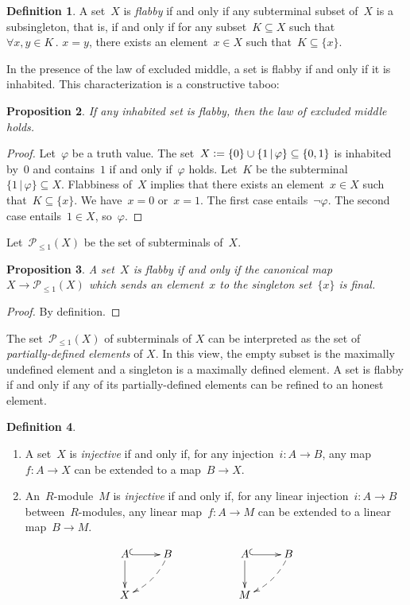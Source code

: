 \documentclass[oneside]{amsart}
\theoremstyle{definition}
\newtheorem{defn}{Definition}[section]
\theoremstyle{plain}
\newtheorem{prop}[defn]{Proposition}
\theoremstyle{remark}
\renewcommand{\P}{\mathcal{P}}
\newcommand{\defeq}{\vcentcolon=}
\renewcommand{\_}{\mathpunct{.}\,}
\begin{document}
\begin{defn}A set~$X$ is \emph{flabby} if and only if any subterminal subset
of~$X$ is a subsingleton, that is, if and only if for any subset~$K \subseteq
X$ such that~$\forall x,y \in K\_ x = y$, there exists an element~$x \in X$
such that~$K \subseteq \{ x \}$.
\end{defn}

In the presence of the law of excluded middle, a set is flabby if and only if
it is inhabited. This characterization is a constructive taboo:

\begin{prop}\label{prop:taboo}
If any inhabited set is flabby, then the law of excluded middle
holds.
\end{prop}

\begin{proof}Let~$\varphi$ be a truth value. The set~$X \defeq \{ 0 \}
\cup \{ 1 \,|\, \varphi \} \subseteq \{ 0,1 \}$ is inhabited by~$0$ and
contains~$1$ if and only if~$\varphi$ holds. Let~$K$ be the subterminal~$\{ 1 \,|\, \varphi
\} \subseteq X$. Flabbiness of~$X$ implies that there exists an element~$x \in
X$ such that~$K \subseteq \{x\}$. We have~$x = 0$ or~$x = 1$. The first case
entails~$\neg\varphi$. The second case entails~$1 \in X$, so~$\varphi$.
\end{proof}

Let~$\P_{\leq 1}(X)$ be the set of subterminals of~$X$.

\begin{prop}A set~$X$ is flabby if and only if the canonical map~$X \to
\P_{\leq 1}(X)$ which sends an element~$x$ to the singleton set~$\{x\}$ is
final.
\end{prop}

\begin{proof}By definition.\end{proof}

The set~$\P_{\leq 1}(X)$ of subterminals of $X$ can be interpreted as the set
of \emph{partially-defined elements} of $X$. In this view, the empty subset is
the maximally undefined element and a singleton is a maximally defined element.
A set is flabby if and only if any of its partially-defined elements can be
refined to an honest element.

\begin{defn}\begin{enumerate}
\item A set~$X$ is \emph{injective} if and only if, for any injection~$i
: A \to B$, any map~$f : A \to X$ can be extended to a map~$B \to X$.
\item An~$R$-module~$M$ is \emph{injective} if and only if, for any linear
injection~$i : A \to B$ between~$R$-modules, any linear map~$f : A \to M$ can
be extended to a linear map~$B \to M$.
\end{enumerate}
\[ \xymatrix{
  A \ar@{^{(}->}[r]\ar[d] & B \ar@{-->}@/^/[ld] &&
  A \ar@{^{(}->}[r]\ar[d] & B \ar@{-->}@/^/[ld] \\
  X &&& M
} \]
\end{defn}
\end{document}
